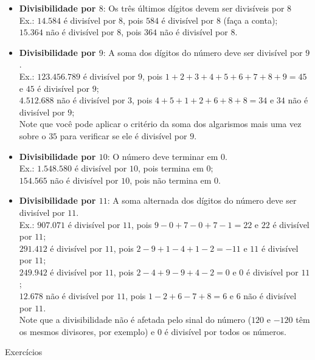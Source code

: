 \documentclass[12pt]{report}
\newcommand{\1}{\faThermometerEmpty}
\newcommand{\2}{\faThermometerQuarter}
\newcommand{\3}{\faThermometerHalf}
\newcommand{\4}{\faThermometerThreeQuarters}
\newcommand{\5}{\faThermometerFull}
\begin{document}
\begin{itemize}
    
    \item \textbf{Divisibilidade por $8$}:  Os três últimos dígitos devem ser divisíveis por $8$\\
    Ex.: $14.584$ é divisível por $8$, pois $584$ é divisível por $8$ (faça a conta);\\
    \phantom{Ex.: }$15.364$ não é divisível por $8$, pois $364$ não é divisível por $8$.
    
    \item \textbf{Divisibilidade por $9$}: A soma dos dígitos do número deve ser divisível por $9$. \\
    Ex.: $123.456.789$ é divisível por $9$, pois $1+2+3+4+5+6+7+8+9=45$ e $45$ é divisível por $9$; \\
    \phantom{Ex.: }$4.512.688$ não é divisível por $3$, pois $4+5+1+2+6+8+8=34$ e $34$ não é divisível por $9$;\\
    Note que você pode aplicar o critério da soma dos algarismos mais uma vez sobre o $35$ para verificar se ele é divisível por $9$.
    
    \item \textbf{Divisibilidade por $10$}: O número deve terminar em $0$.\\
    Ex.: $1.548.580$ é divisível por $10$, pois termina em $0$;\\
    \phantom{Ex.: }$154.565$ não é divisível por $10$, pois não termina em $0$.
    
    \item \textbf{Divisibilidade por $11$}: A soma alternada dos dígitos do número deve ser divisível por $11$.\\
    Ex.: $907.071$ é divisível por $11$, pois $9-0+7-0+7-1=22$ e $22$ é divisível por $11$; \\
    \phantom{Ex.: }$291.412$ é divisível por $11$, pois $2-9+1-4+1-2=-11$ e $11$ é divisível por $11$; \\
    \phantom{Ex.: }$249.942$ é divisível por $11$, pois $2-4+9-9+4-2=0$ e $0$ é divisível por $11$; \\
    \phantom{Ex.: }$12.678$ não é divisível por $11$, pois $1-2+6-7+8=6$ e $6$ não é divisível por $11$. \\
    Note que a divisibilidade não é afetada pelo sinal do número ($120$ e $-120$ têm os mesmos divisores, por exemplo) e $0$ é divisível por todos os números.
\end{itemize}

\pagebreak

\begin{center}
{\Large Exercícios}
\end{center}
\end{document}
